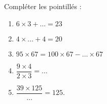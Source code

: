 
\begin{exercice}\label{exosmath-0822}

Compléter les pointillés :
\begin{multicols}{2}
    \begin{enumerate}
        \item
            \( 6\times 3+\ldots=23\)
        \item
            \( 4\times \ldots +4=20\)
        \item
            \( 95\times 67=100\times 67-\ldots\times 67\)
        \item
            \( \dfrac{ 9\times 4 }{ 2\times 3 }=\ldots\)
        \item
            \( \dfrac{ 39\times 125 }{ \ldots }=125\).
    \end{enumerate}
\end{multicols}

\end{exercice}
